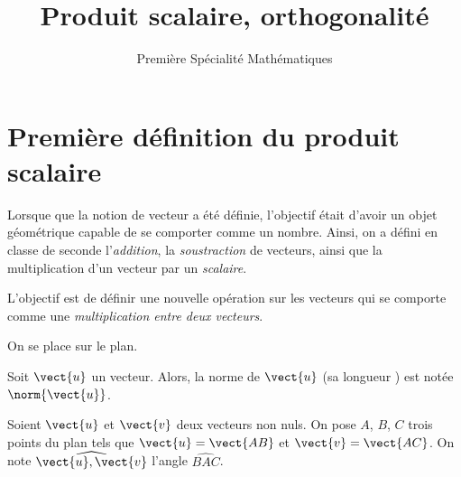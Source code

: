 \documentclass{article}
\title{Produit scalaire, orthogonalité}
\date{}
\author{Première Spécialité Mathématiques}
\begin{document}
\maketitle

\section{Première définition du produit scalaire}

Lorsque que la notion de vecteur a été définie, l'objectif était d'avoir un objet géométrique capable de se comporter comme un nombre. Ainsi, on a défini en classe de seconde l'\emph{addition}, la \emph{soustraction} de vecteurs, ainsi que la multiplication d'un vecteur par un \emph{scalaire}.

L'objectif est de définir une nouvelle opération sur les vecteurs qui se comporte comme une \emph{multiplication entre deux vecteurs}.

On se place sur le plan.

\begin{tcolorbox}
\begin{definition}
Soit $\vect{u}$ un vecteur. Alors, la norme de $\vect{u}$ (sa \og longueur \fg) est notée $\norm{\vect{u}}$.
\end{definition}
\end{tcolorbox}

\begin{tcolorbox}
\begin{definition}
Soient $\vect{u}$ et $\vect{v}$ deux vecteurs non nuls. On pose $A$, $B$, $C$ trois points du plan tels que $\vect{u} = \vect{AB}$ et $\vect{v} = \vect{AC}$. On note $\widehat{\vect{u},\vect{v}}$ l'angle $\widehat{BAC}$. 
\end{definition}
\end{tcolorbox}
\begin{center}
\end{center}
\end{document}
